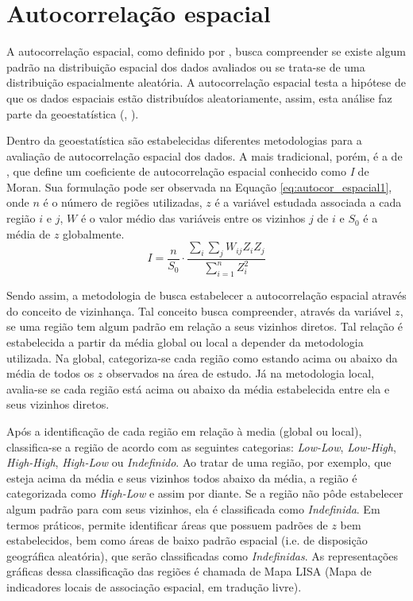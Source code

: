 \section{Autocorrelação espacial} \label{sec:autocorrelacaoEsp}

A autocorrelação espacial, como definido por , busca compreender se existe algum padrão na distribuição espacial dos dados avaliados ou se trata-se de uma distribuição espacialmente aleatória.
A autocorrelação espacial testa a hipótese de que os dados espaciais estão distribuídos aleatoriamente, assim, esta análise faz parte da geoestatística (, \citeyear{10.2113/gsecongeo.58.8.1246}).

Dentro da geoestatística são estabelecidas diferentes metodologias para a avaliação de autocorrelação espacial dos dados.
A mais tradicional, porém, é a de , que define um coeficiente de autocorrelação espacial conhecido como \textit{I} de Moran.
Sua formulação pode ser observada na Equação \ref{eq:autocor_espacial1}, onde $n$ é o número de regiões utilizadas, $z$ é a variável estudada associada a cada região $i$ e $j$, $W$ é o valor médio das variáveis entre os vizinhos $j$ de $i$ e $S_{0}$ é a média de $z$ globalmente.
%
\begin{equation} \label{eq:autocor_espacial1}
    I = \frac{n}{S_{0}} \cdot \frac{\sum_{i} \sum_{j} W_{ij} Z_{i} Z_{j}}{\sum_{i=1}^{n} Z^2_{i}}
\end{equation}

Sendo assim, a metodologia de  busca estabelecer a autocorrelação espacial através do conceito de vizinhança. 
Tal conceito busca compreender, através da variável $z$, se uma região tem algum padrão em relação a seus vizinhos diretos. 
Tal relação é estabelecida a partir da média global ou local a depender da metodologia utilizada.
Na global, categoriza-se cada região como estando acima ou abaixo da média de todos os $z$ observados na área de estudo. 
Já na metodologia local, avalia-se se cada região está acima ou abaixo da média estabelecida entre ela e seus vizinhos diretos.

Após a identificação de cada região em relação à media (global ou local), classifica-se a região de acordo com as seguintes categorias: \textit{Low-Low}, \textit{Low-High}, \textit{High-High}, \textit{High-Low} ou \textit{Indefinido}.
Ao tratar de uma região, por exemplo, que esteja acima da média e seus vizinhos todos abaixo da média, a região é categorizada como \textit{High-Low} e assim por diante.
Se a região não pôde estabelecer algum padrão para com seus vizinhos, ela é classificada como \textit{Indefinida}.
Em termos práticos,  permite identificar áreas que possuem padrões de $z$ bem estabelecidos, bem como áreas de baixo padrão espacial (i.e. de disposição geográfica aleatória), que serão classificadas como \textit{Indefinidas}. As representações gráficas dessa classificação das regiões é chamada de Mapa LISA (Mapa de indicadores locais de associação espacial, em tradução livre).

